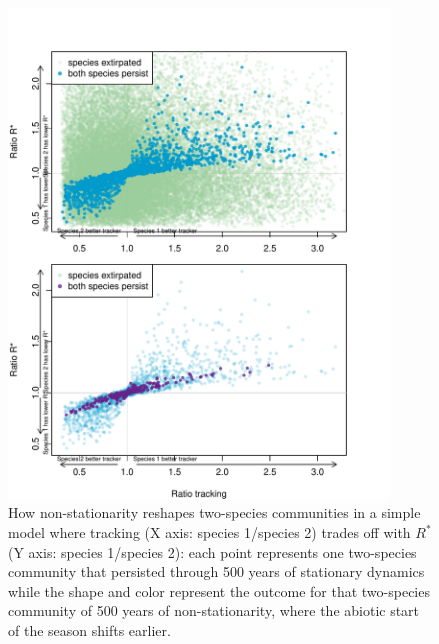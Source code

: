 \documentclass[11pt,letterpaper]{article}
\begin{document}
\begin{figure}[t!]
\centering
\includegraphics[width=0.9\textwidth]{..//..//R/graphs/modelruns/manuscript/alpharstar_2panel.pdf}
\caption{How non-stationarity reshapes two-species communities in a simple model where tracking (X axis: species 1/species 2) trades off with $R^*$ (Y axis: species 1/species 2): each point represents one two-species community that persisted through 500 years of stationary dynamics while the shape and color represent the outcome for that two-species community of 500 years of non-stationarity, where the abiotic start of the season shifts earlier.}
\label{fig:alpharstar}
\end{figure}
\end{document}
